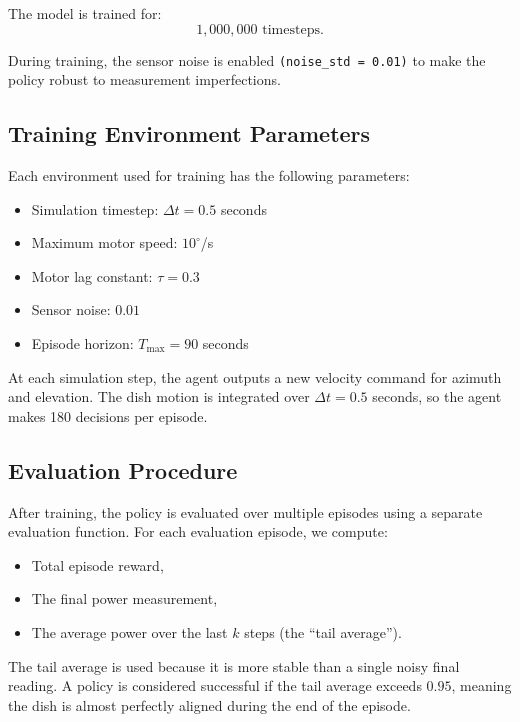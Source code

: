\documentclass[11pt,a4paper]{article}
\begin{document}
The model is trained for:
\begin{equation}
1{,}000{,}000 \text{ timesteps}.
\end{equation}

During training, the sensor noise is enabled \texttt{(noise\_std = 0.01)} to make the policy robust to measurement imperfections.

\subsection{Training Environment Parameters}

Each environment used for training has the following parameters:

\begin{itemize}
    \item Simulation timestep: $\Delta t = 0.5$ seconds
    \item Maximum motor speed: $10^\circ$/s
    \item Motor lag constant: $\tau = 0.3$
    \item Sensor noise: $0.01$
    \item Episode horizon: $T_{\max} = 90$ seconds
\end{itemize}

At each simulation step, the agent outputs a new velocity command for azimuth and elevation.  
The dish motion is integrated over $\Delta t = 0.5$ seconds, so the agent makes 180 decisions per episode.

\subsection{Evaluation Procedure}

After training, the policy is evaluated over multiple episodes using a separate evaluation function.  
For each evaluation episode, we compute:

\begin{itemize}
    \item Total episode reward,
    \item The final power measurement,
    \item The average power over the last $k$ steps (the ``tail average'').
\end{itemize}

The tail average is used because it is more stable than a single noisy final reading.  
A policy is considered successful if the tail average exceeds $0.95$, meaning the dish is almost perfectly aligned during the end of the episode.
\end{document}
